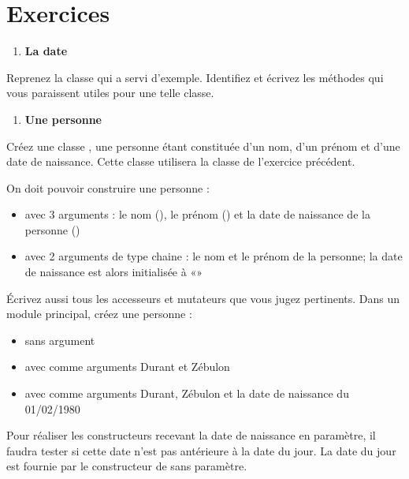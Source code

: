 \section{Exercices}
\liststyleExercice
\begin{enumerate}
\item {\sffamily\bfseries
La date}
\end{enumerate}
{
Reprenez la classe  qui a servi
d'exemple. Identifiez et écrivez les méthodes qui vous
paraissent utiles pour une telle classe.}

\liststyleExercice
\setcounter{saveenum}{\value{enumi}}
\begin{enumerate}
\setcounter{enumi}{\value{saveenum}}
\item {\sffamily\bfseries
Une personne}
\end{enumerate}
{
Créez une classe , une personne étant
constituée d'un nom, d'un prénom et
d'une date de naissance. Cette classe utilisera la
classe  de l'exercice
précédent.}

{
On doit pouvoir construire une personne :}

\liststyleListi
\begin{itemize}
\item {
avec 3 arguments : le nom (), le prénom
() et la date de naissance de la personne
()}
\item {
avec 2 arguments de type chaine : le nom et le prénom de la personne; la
date de naissance est alors initialisée à «»}
\end{itemize}
{
Écrivez aussi tous les accesseurs et mutateurs que vous jugez
pertinents. Dans un module principal, créez une personne :}

\liststyleListi
\begin{itemize}
\item {
sans argument}
\item {
avec comme arguments {\textquotedbl}Durant{\textquotedbl} et
{\textquotedbl}Zébulon{\textquotedbl}}
\item {
avec comme arguments {\textquotedbl}Durant{\textquotedbl},
{\textquotedbl}Zébulon{\textquotedbl} et la date de naissance du
01/02/1980}
\end{itemize}
{
Pour réaliser les constructeurs recevant la date de naissance en
paramètre, il faudra tester si cette date n’est pas antérieure à la
date du jour. La date du jour est fournie par le constructeur de
 sans paramètre.}

